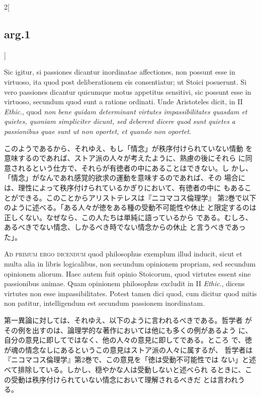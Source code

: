 \documentclass[paper=a4paper,fontsize=10pt,jafontsize=9pt,titlepage]{jlreq}
\begin{document}
\begin{paracol}{2}[\subsection{arg.1}]
\switchcolumn*

Sic igitur, si passiones dicantur inordinatae affectiones, non
 possunt esse in virtuoso, ita quod post deliberationem eis
 consentiatur; ut Stoici posuerunt. Si vero passiones dicantur
 quicumque motus appetitus sensitivi, sic possunt esse in virtuoso,
 secundum quod sunt a ratione ordinati. Unde Aristoteles dicit, in II
 {\itshape Ethic}., quod {\itshape non bene quidam determinant
 virtutes impassibilitates quasdam et quietes, quoniam simpliciter
 dicunt, sed deberent dicere quod sunt quietes a passionibus quae sunt
 ut non oportet, et quando non oportet}.

\switchcolumn

このようであるから、それゆえ、もし「情念」が秩序付けられていない情動
 を意味するのであれば、ストア派の人々が考えたように、熟慮の後にそれら
 に同意されるという仕方で、それらが有徳者の中にあることはできない。し
 かし、「情念」がなんであれ感覚的欲求の運動を意味するのであれば、その
 場合には、理性によって秩序付けられているかぎりにおいて、有徳者の中に
 もあることができる。このことからアリストテレスは『ニコマコス倫理学』
 第2巻で以下のように述べる。「ある人々が徳をある種の受動不可能性や休止
 と限定するのは正しくない。なぜなら、この人たちは単純に語っているから
 である。むしろ、あるべきでない情念、しかるべき時でない情念からの休止
 と言うべきであった」。

\switchcolumn*[\subsection{ad.1}]

{\scshape Ad primum ergo dicendum} quod philosophus exemplum illud
inducit, sicut et multa alia in libris logicalibus, non secundum
opinionem propriam, sed secundum opinionem aliorum. Haec autem fuit
opinio Stoicorum, quod virtutes essent sine passionibus animae. Quam
opinionem philosophus excludit in II {\itshape Ethic}., dicens
virtutes non esse impassibilitates. Potest tamen dici quod, cum
dicitur quod mitis non patitur, intelligendum est secundum passionem
inordinatam.

\switchcolumn

第一異論に対しては、それゆえ、以下のように言われるべきである。哲学者
 がその例を出すのは、論理学的な著作においては他にも多くの例があるよう
 に、自分の意見に即してではなく、他の人々の意見に即してである。ところ
 で、徳が魂の情念なしにあるというこの意見はストア派の人々に属するが、
 哲学者は『ニコマコス倫理学』第2巻で、この意見を「徳は受動不可能性では
 ない」と述べて排除している。しかし、穏やかな人は受動しないと述べられ
 るときに、この受動は秩序付けられていない情念において理解されるべきだ
 とは言われうる。


\end{paracol}
\end{document}
